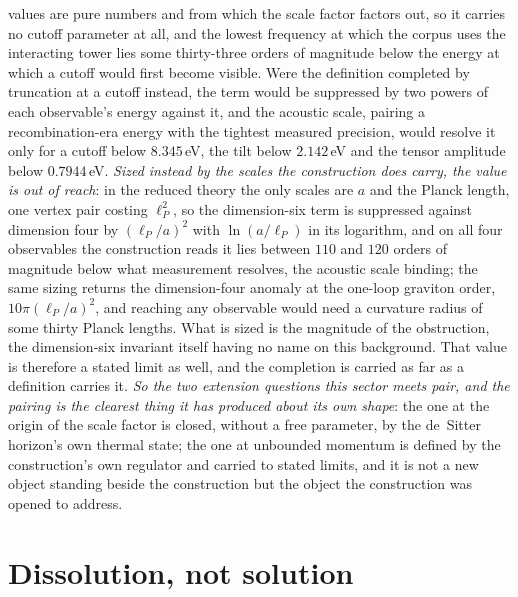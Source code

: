 \documentclass[11pt,a4paper]{article}
\theoremstyle{plain}
\theoremstyle{definition}
\theoremstyle{remark}
\begin{document}
values are pure numbers and from which the scale factor factors out, so it carries no cutoff parameter at all, and the
lowest frequency at which the corpus uses the interacting tower lies some thirty-three orders of magnitude below the
energy at which a cutoff would first become visible. Were the definition completed by truncation at a
cutoff instead, the term would be suppressed by two powers of each observable's energy against it, and the acoustic
scale, pairing a recombination-era energy with the tightest measured precision, would resolve it only for a cutoff
below $8.345$\,eV, the tilt below $2.142$\,eV and the tensor amplitude below $0.7944$\,eV.
\emph{Sized instead by the scales the construction does carry, the value is out of reach}: in the reduced theory the
only scales are $a$ and the Planck length, one vertex pair costing $\ell_P^2$, so the dimension-six term is suppressed
against dimension four by $(\ell_P/a)^2$ with $\ln(a/\ell_P)$ in its logarithm, and on all four observables the
construction reads it lies between $110$ and $120$ orders of magnitude below what measurement resolves, the
acoustic scale binding; the same sizing returns the dimension-four anomaly at the one-loop graviton order,
$10\pi(\ell_P/a)^2$, and reaching any observable would need a curvature radius of some thirty Planck lengths. What is
sized is the magnitude of the obstruction, the dimension-six invariant itself having no name on this
background. That value is therefore a stated limit as well, and the completion is carried as far as a
definition carries it. \emph{So the two
extension questions this sector meets pair, and the pairing is the clearest thing it has produced about its own
shape}: the one at the origin of the scale factor is closed, without a free parameter, by the de~Sitter
horizon's own thermal state; the one at unbounded momentum is defined by the construction's own regulator and carried to stated limits, and it
is not a new object standing beside the construction but the object the construction was opened to address.

\section{Dissolution, not solution}\label{sec:dissolution}
\end{document}
